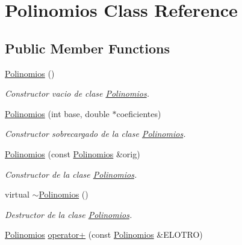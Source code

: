 \hypertarget{class_polinomios}{}\section{Polinomios Class Reference}
\label{class_polinomios}
\subsection*{Public Member Functions}
\begin{DoxyCompactItemize}
\item 
\hypertarget{class_polinomios_a59b6e7c9151fed121cbb2842b05f6d17}{}\label{class_polinomios_a59b6e7c9151fed121cbb2842b05f6d17} 
\hyperlink{class_polinomios_a59b6e7c9151fed121cbb2842b05f6d17}{Polinomios} ()
\begin{DoxyCompactList}\small\item\em Constructor vacio de clase \hyperlink{class_polinomios}{Polinomios}. \end{DoxyCompactList}\item 
\hyperlink{class_polinomios_aeb9c018067d74b6294d4b272a5f397a2}{Polinomios} (int base, double $\ast$coeficientes)
\begin{DoxyCompactList}\small\item\em Constructor sobrecargado de la clase \hyperlink{class_polinomios}{Polinomios}. \end{DoxyCompactList}\item 
\hyperlink{class_polinomios_a399a99085decb3f03d9bca9c2cba06b6}{Polinomios} (const \hyperlink{class_polinomios}{Polinomios} \&orig)
\begin{DoxyCompactList}\small\item\em Constructor de la clase \hyperlink{class_polinomios}{Polinomios}. \end{DoxyCompactList}\item 
\hypertarget{class_polinomios_aeb49e0a27d32beba23b8c485d4b251be}{}\label{class_polinomios_aeb49e0a27d32beba23b8c485d4b251be} 
virtual \hyperlink{class_polinomios_aeb49e0a27d32beba23b8c485d4b251be}{$\sim$\+Polinomios} ()
\begin{DoxyCompactList}\small\item\em Destructor de la clase \hyperlink{class_polinomios}{Polinomios}. \end{DoxyCompactList}\item 
\hyperlink{class_polinomios}{Polinomios} \hyperlink{class_polinomios_a57c9bd1d4b82e7f9a6ad08b4121c3eb6}{operator+} (const \hyperlink{class_polinomios}{Polinomios} \&E\+L\+O\+T\+RO)

\end{DoxyCompactItemize}
